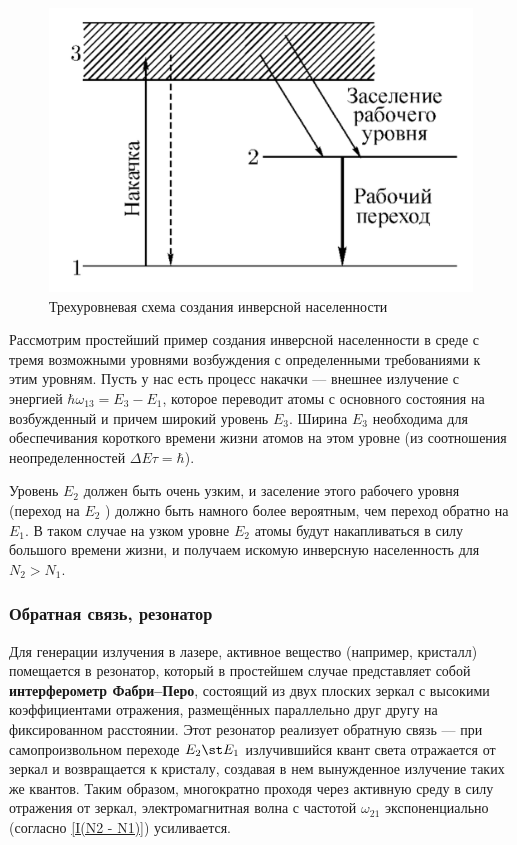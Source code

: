 \documentclass[12pt]{kiarticle}
\begin{document}
\begin{figure} 
	\includegraphics[width=\linewidth]{work}
	\caption{Трехуровневая схема создания инверсной населенности}
	\label{work}
\end{figure}

Рассмотрим простейший пример создания инверсной населенности  в среде с тремя возможными уровнями возбуждения с определенными требованиями к этим уровням. Пусть у нас есть процесс накачки --- внешнее излучение с энергией $ \hbar \omega_{13} = E_3 - E_1 $, которое переводит атомы с основного состояния на возбужденный и причем широкий уровень $ E_3 $. Ширина $ E_3 $ необходима для обеспечивания короткого времени жизни атомов на этом уровне (из соотношения неопределенностей $ \Delta E \tau = \hbar $).

Уровень $ E_2 $ должен быть очень узким, и заселение этого рабочего уровня  (переход на  $ E_2 $ ) должно быть намного более вероятным, чем переход обратно на $ E_1 $. В таком случае на узком уровне $ E_2 $ атомы будут накапливаться в силу большого времени жизни, и получаем искомую инверсную населенность для $ N_2 > N_1 $.

 \subsubsection{Обратная связь, резонатор}

Для генерации излучения в лазере, активное вещество (например, кристалл) помещается в резонатор, который в простейшем случае представляет собой \textbf{интерферометр Фабри–Перо}, состоящий из двух плоских зеркал с
высокими коэффициентами отражения, размещённых параллельно друг другу на фиксированном расстоянии. Этот резонатор реализует обратную связь --- при самопроизвольном переходе $ E_2 \st E_1 $ излучившийся квант света отражается от зеркал и возвращается к кристалу, создавая в нем вынужденное излучение таких же квантов. Таким образом, многократно проходя через активную среду в силу отражения от зеркал, электромагнитная волна с частотой $ \omega_{21} $ экспоненциально (согласно \eqref{I(N2 - N1)}) усиливается. 
\end{document}
